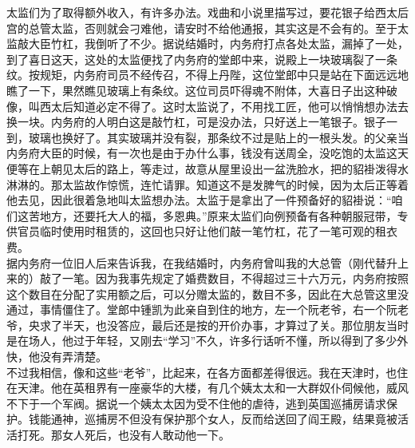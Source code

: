 太监们为了取得额外收入，有许多办法。戏曲和小说里描写过，要花银子给西太后宫的总管太监，否则就会刁难他，请安时不给他通报，其实这是不会有的。至于太监敲大臣竹杠，我倒听了不少。据说结婚时，内务府打点各处太监，漏掉了一处，到了喜日这天，这处的太监便找了内务府的堂郎中来，说殿上一块玻璃裂了一条纹。按规矩，内务府司员不经传召，不得上丹陛，这位堂郎中只是站在下面远远地瞧了一下，果然瞧见玻璃上有条纹。这位司员吓得魂不附体，大喜日子出这种破像，叫西太后知道必定不得了。这时太监说了，不用找工匠，他可以悄悄想办法去换一块。内务府的人明白这是敲竹杠，可是没办法，只好送上一笔银子。银子一到，玻璃也换好了。其实玻璃并没有裂，那条纹不过是贴上的一根头发。的父亲当内务府大臣的时候，有一次也是由于办什么事，钱没有送周全，没吃饱的太监这天便等在上朝见太后的路上，等走过，故意从屋里设出一盆洗脸水，把的貂褂泼得水淋淋的。那太监故作惊慌，连忙请罪。知道这不是发脾气的时候，因为太后正等着他去见，因此很着急地叫太监想办法。太监于是拿出了一件预备好的貂褂说：“咱们这苦地方，还要托大人的福，多恩典。”原来太监们向例预备有各种朝服冠带，专供官员临时使用时租赁的，这回也只好让他们敲一笔竹杠，花了一笔可观的租衣费。\\

据内务府一位旧人后来告诉我，在我结婚时，内务府曾叫我的大总管（刚代替升上来的）敲了一笔。因为我事先规定了婚费数目，不得超过三十六万元，内务府按照这个数目在分配了实用额之后，可以分赠太监的，数目不多，因此在大总管这里没通过，事情僵住了。堂郎中锺凯为此亲自到住的地方，左一个阮老爷，右一个阮老爷，央求了半天，也没答应，最后还是按的开价办事，才算过了关。那位朋友当时是在场人，他过于年轻，又刚去“学习”不久，许多行话听不懂，所以得到了多少外快，他没有弄清楚。\\

不过我相信，像和这些“老爷”，比起来，在各方面都差得很远。我在天津时，也住在天津。他在英租界有一座豪华的大楼，有几个姨太太和一大群奴仆伺候他，威风不下于一个军阀。据说一个姨太太因为受不住他的虐待，逃到英国巡捕房请求保护。钱能通神，巡捕房不但没有保护那个女人，反而给送回了阎王殿，结果竟被活活打死。那女人死后，也没有人敢动他一下。
